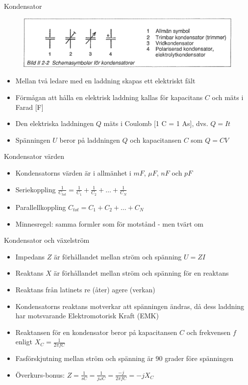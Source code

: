 \documentclass{beamer}
\begin{document}
\begin{frame}{Kondensator}

\begin{figure}[h]
\includegraphics[width=\textwidth]{images/bild_2_2-02}
\end{figure}

\begin{itemize}
  \item Mellan två ledare med en laddning skapas ett elektriskt fält
  \item Förmågan att hålla en elektrisk laddning kallas för kapacitans $C$ och mäts i Farad [F]
  \item Den elektriska laddningen $Q$ mäts i Coulomb [1 C = 1 As], dvs. $Q=It$
  \item Spänningen $U$ beror på laddningen $Q$ och kapacitansen $C$ som $Q=CV$
\end{itemize}
\end{frame}

\begin{frame}{Kondensator värden}
  \begin{itemize}
    \item Kondensatorns värden är i allmänhet i $mF$, $\mu F$, $nF$ och $pF$
    \item Seriekoppling $\frac{1}{C_{tot}} = \frac{1}{C_1} + \frac{1}{C_2} + \ldots + \frac{1}{C_N}$
    \item Parallellkoppling $C_{tot} = C_1 + C_2 + \ldots + C_N$
    \item Minnesregel: samma formler som för motstånd - men tvärt om
  \end{itemize}
\end{frame}

\begin{frame}{Kondensator och växelström}
  \begin{itemize}
  \item Impedans $Z$ är förhållandet mellan ström och spänning $U=ZI$
  \item Reaktans $X$ är förhållandet mellan ström och spänning för en reaktans
  \item Reaktans från latinets re (åter) agere (verkan)
  \item Kondensatorns reaktans motverkar att spänningen ändras, då dess laddning har motsvarande Elektromotorisk Kraft (EMK)
  \item Reaktansen för en kondensator beror på kapacitansen $C$ och frekvensen $f$ enligt $X_C = \frac{1}{2\pi f C}$
  \item Fasförskjutning mellan ström och spänning är 90 grader före spänningen
  \item Överkurs-bonus: $Z = \frac{1}{sC} = \frac{1}{j\omega C} = \frac{-j}{2\pi f C} = -jX_C$ 
  \end{itemize}
\end{frame}
\end{document}
